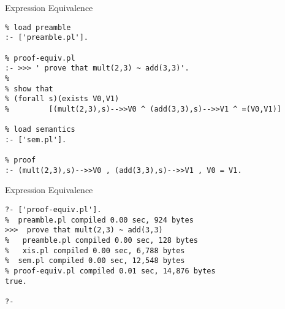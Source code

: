 \documentclass{beamer}
\begin{document}
\begin{frame}[fragile]{Expression Equivalence}
\small
\begin{verbatim}
% load preamble
:- ['preamble.pl'].

% proof-equiv.pl
:- >>> ' prove that mult(2,3) ~ add(3,3)'.
%
% show that
% (forall s)(exists V0,V1)
%         [(mult(2,3),s)-->>V0 ^ (add(3,3),s)-->>V1 ^ =(V0,V1)]

% load semantics
:- ['sem.pl'].

% proof
:- (mult(2,3),s)-->>V0 , (add(3,3),s)-->>V1 , V0 = V1.
\end{verbatim}
\end{frame}


\begin{frame}[fragile]{Expression Equivalence}
\scriptsize
\begin{verbatim}
?- ['proof-equiv.pl'].
%  preamble.pl compiled 0.00 sec, 924 bytes
>>>  prove that mult(2,3) ~ add(3,3)
%   preamble.pl compiled 0.00 sec, 128 bytes
%   xis.pl compiled 0.00 sec, 6,788 bytes
%  sem.pl compiled 0.00 sec, 12,548 bytes
% proof-equiv.pl compiled 0.01 sec, 14,876 bytes
true.

?- 
\end{verbatim}

\end{frame}
\end{document}
